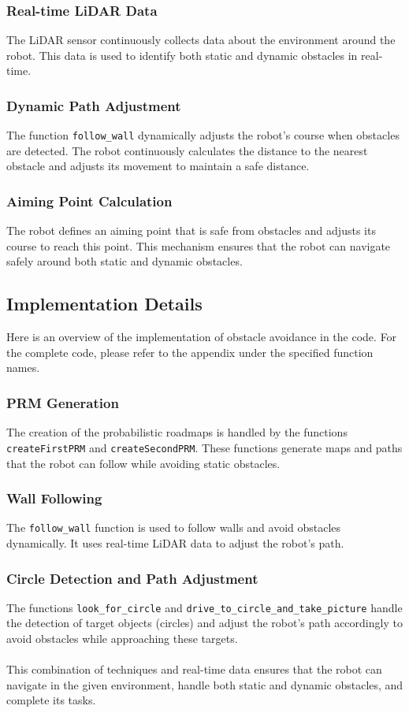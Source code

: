 \documentclass{article}
\begin{document}
	\subsubsection{Real-time LiDAR Data}
	The LiDAR sensor continuously collects data about the environment around the robot. This data is used to identify both static and dynamic obstacles in real-time.
	
	\subsubsection{Dynamic Path Adjustment}
	The function \texttt{follow\_wall} dynamically adjusts the robot's course when obstacles are detected. The robot continuously calculates the distance to the nearest obstacle and adjusts its movement to maintain a safe distance.
	
	\subsubsection{Aiming Point Calculation}
	The robot defines an aiming point that is safe from obstacles and adjusts its course to reach this point. This mechanism ensures that the robot can navigate safely around both static and dynamic obstacles.
	
	\subsection{Implementation Details}
	Here is an overview of the implementation of obstacle avoidance in the code. For the complete code, please refer to the appendix under the specified function names.
	
	\subsubsection{PRM Generation}
	The creation of the probabilistic roadmaps is handled by the functions \texttt{createFirstPRM} and \texttt{createSecondPRM}. These functions generate maps and paths that the robot can follow while avoiding static obstacles.
	
	\subsubsection{Wall Following}
	The \texttt{follow\_wall} function is used to follow walls and avoid obstacles dynamically. It uses real-time LiDAR data to adjust the robot's path.
	
	\subsubsection{Circle Detection and Path Adjustment}
	The functions \texttt{look\_for\_circle} and \texttt{drive\_to\_circle\_and\_take\_picture} handle the detection of target objects (circles) and adjust the robot's path accordingly to avoid obstacles while approaching these targets.
	\\\\
	This combination of techniques and real-time data ensures that the robot can navigate in the given environment, handle both static and dynamic obstacles, and complete its tasks.
	
\end{document}
